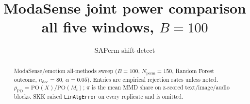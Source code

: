 \documentclass[11pt]{article}
\title{ModaSense joint power comparison\\
{\large all five windows, $B{=}100$}}
\author{SAPerm shift-detect}
\date{}
\begin{document}
\maketitle

\begin{abstract}
\noindent
ModaSense/emotion all-methods sweep
($B{=}100$, $N_{\mathrm{perm}}{=}150$,
Random Forest outcome, $n_{\mathrm{doc}}{=}80$, $\alpha{=}0.05$).
Entries are empirical rejection rates unless noted.
$\rho_{\mathrm{PO}}=\mathrm{PO}(X)/\mathrm{PO}(M_t)$;
$\pi$ is the mean MMD share on z-scored text/image/audio blocks.
SKK raised \texttt{LinAlgError} on every replicate and is omitted.
\end{abstract}

\begin{table}[ht]
\centering
\caption{ModaSense joint power ($B{=}100$).
Random split is the Type-I check.
Concept drift keeps $P(X)$ and replaces the new-batch label with
\texttt{image\_label}.
Text / image / audio windows are covariate splits on the named meta channel.
Miles $=$ random-projection test on $X$.}
\label{tab:modasense_power}
\end{table}
\end{document}
